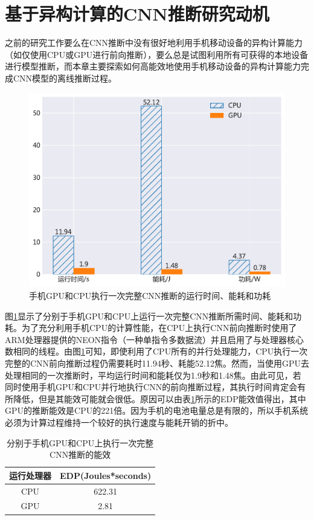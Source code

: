 \section{基于异构计算的CNN推断研究动机}
\label{chapter:chapter4-2}
之前的研究工作要么在CNN推断中没有很好地利用手机移动设备的异构计算能力（如仅使用CPU或GPU进行前向推断），要么总是试图利用所有可获得的本地设备进行模型推断，而本章主要探索如何高能效地使用手机移动设备的异构计算能力完成CNN模型的离线推断过程。

\begin{figure}[htbp]
    \centering
    \includegraphics[height=0.4\textwidth]{figures/yolo_energy.pdf}
    \caption{手机GPU和CPU执行一次完整CNN推断的运行时间、能耗和功耗}\label{figure:figure28}
\end{figure}

图\ref{figure:figure28}显示了分别于手机GPU和CPU上运行一次完整CNN推断所需时间、能耗和功耗。为了充分利用手机CPU的计算性能，在CPU上执行CNN前向推断时使用了ARM处理器提供的NEON指令（一种单指令多数据流）并且启用了与处理器核心数相同的线程。由图\ref{figure:figure28}可知，即使利用了CPU所有的并行处理能力，CPU执行一次完整的CNN前向推断过程仍需要耗时11.94秒、耗能52.12焦。然而，当使用GPU去处理相同的一次推断时，平均运行时间和能耗仅为1.9秒和1.48焦。由此可见，若同时使用手机GPU和CPU并行地执行CNN的前向推断过程，其执行时间肯定会有所降低，但是其能效可能就会很低。原因可以由表\ref{table:table9}所示的EDP能效值得出，其中GPU的推断能效是CPU的221倍。因为手机的电池电量总是有限的，所以手机系统必须为计算过程维持一个较好的执行速度与能耗开销的折中。

\begin{table}[htbp]
  \centering
  \caption{分别于手机GPU和CPU上执行一次完整CNN推断的能效}
  \label{table:table9}
  \begin{tabular}{cc}
    \toprule
      运行处理器 & EDP(Joules*seconds) \\
    \midrule
      CPU & 622.31 \\
      GPU & 2.81 \\
    \bottomrule
  \end{tabular}
\end{table}

